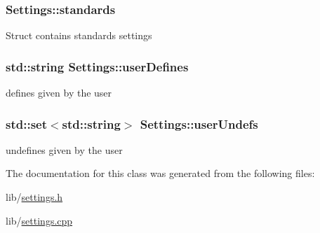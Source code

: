 \hypertarget{class_settings_affed1d4355e85d3c4abb1364964e2ff5}{
\subsubsection[{standards}]{ Settings\-::standards}}\label{class_settings_affed1d4355e85d3c4abb1364964e2ff5}
Struct contains standards settings \hypertarget{class_settings_a8829507f5f2c8bbc1717169ba21edabd}{
\subsubsection[{user\-Defines}]{\setlength{\rightskip}{0pt plus 5cm}std\-::string Settings\-::user\-Defines}}\label{class_settings_a8829507f5f2c8bbc1717169ba21edabd}


defines given by the user 

\hypertarget{class_settings_a010d28fdcfcb50e46fc7de37086da957}{
\subsubsection[{user\-Undefs}]{\setlength{\rightskip}{0pt plus 5cm}std\-::set$<$std\-::string$>$ Settings\-::user\-Undefs}}\label{class_settings_a010d28fdcfcb50e46fc7de37086da957}


undefines given by the user 



The documentation for this class was generated from the following files\-:\begin{DoxyCompactItemize}
\item 
lib/\hyperlink{settings_8h}{settings.\-h}\item 
lib/\hyperlink{settings_8cpp}{settings.\-cpp}\end{DoxyCompactItemize}
